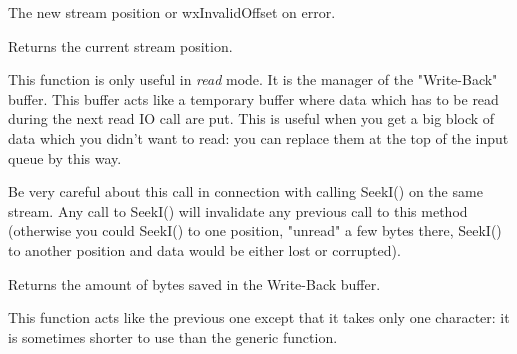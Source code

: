 



The new stream position or wxInvalidOffset on error.

\label{wxinputstreamtelli}


Returns the current stream position.

\label{wxinputstreamungetch}


This function is only useful in {\it read} mode. It is the manager of the "Write-Back"
buffer. This buffer acts like a temporary buffer where data which has to be
read during the next read IO call are put. This is useful when you get a big
block of data which you didn't want to read: you can replace them at the top
of the input queue by this way.

Be very careful about this call in connection with calling SeekI() on the same
stream. Any call to SeekI() will invalidate any previous call to this method
(otherwise you could SeekI() to one position, "unread" a few bytes there, SeekI()
to another position and data would be either lost or corrupted).


Returns the amount of bytes saved in the Write-Back buffer.


This function acts like the previous one except that it takes only one
character: it is sometimes shorter to use than the generic function.

